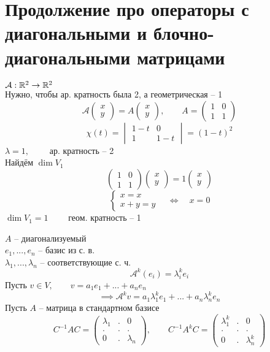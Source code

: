 \section{Продолжение про операторы с диагональными и \n блочно-диагональными матрицами}

\begin{eg}
	$ \mathcal{A} : \mathbb{R}^2 \to \mathbb{R}^2 $ \\
	Нужно, чтобы ар. кратность была 2, а геометрическая -- 1
	$$ \mathcal{A}
	\begin{pmatrix}
		x \\
		y
	\end{pmatrix} = A
	\begin{pmatrix}
		x \\
		y
	\end{pmatrix}, \qquad A =
	\begin{pmatrix}
		1 & 0 \\
		1 & 1
	\end{pmatrix} $$
	$$ \chi(t) =
	\begin{vmatrix}
		1 - t & 0 \\
		1 & 1 - t
	\end{vmatrix} = (1 - t)^2 $$
	$ \lambda = 1, \qquad $ ар. кратность -- 2 \\
	Найдём $ \dim V_1 $
	$$
	\begin{pmatrix}
		1 & 0 \\
		1 & 1
	\end{pmatrix}
	\begin{pmatrix}
		x \\
		y
	\end{pmatrix} = 1
	\begin{pmatrix}
		x \\
		y
	\end{pmatrix} $$
	$$
	\begin{cases}
		x = x \\
		x + y = y
	\end{cases} \quad \iff \quad x = 0 $$
	$ \dim V_1 = 1 \qquad $ геом. кратность -- 1
\end{eg}

\begin{remark}
	$ A $ -- диагонализуемый \\
	$ e_1, ..., e_n $ -- базис из с. в. \\
	$ \lambda_1, ..., \lambda_n $ -- соответствующие с. ч.
	$$ \mathcal{A}^k(e_i) = \lambda_i^ke_i $$
	Пусть $ v \in V, \qquad v = a_1e_1 + ... + a_ne_n $
	$$ \implies \mathcal{A}^kv = a_1\lambda_1^ke_1 + ... + a_n\lambda_n^ke_n $$
	Пусть $ A $ -- матрица в стандартном базисе
	$$ C^{-1}AC =
	\begin{pmatrix}
		\lambda_1 & . & 0 \\
		. & . & . \\
		0 & . & \lambda_n
	\end{pmatrix}, \qquad C^{-1}A^kC =
	\begin{pmatrix}
		\lambda_1^k & . & 0 \\
		. & . & . \\
		0 & . & \lambda_n^k
	\end{pmatrix} $$
\end{remark}

